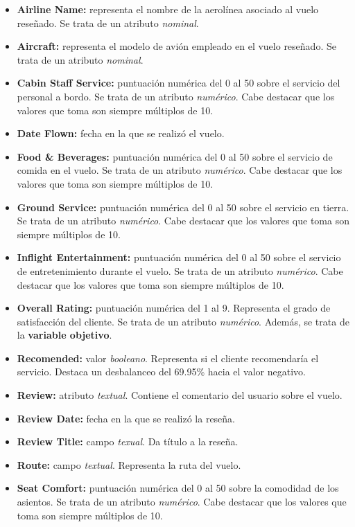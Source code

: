 \documentclass[es]{uc3mreport}
\begin{document}
\begin{report}
\begin{itemize}
    \item \textbf{Airline Name:} representa el nombre de la aerolínea asociado al vuelo reseñado. Se trata de un atributo \textit{nominal}.
    \item \textbf{Aircraft:} representa el modelo de avión empleado en el vuelo reseñado. Se trata de un atributo \textit{nominal}.
    \item \textbf{Cabin Staff Service:} puntuación numérica del 0 al 50 sobre el servicio del personal a bordo. Se trata de un atributo \textit{numérico}. Cabe destacar que los valores que toma son siempre múltiplos de 10.
    \item \textbf{Date Flown:} fecha en la que se realizó el vuelo.
    \item \textbf{Food \& Beverages:} puntuación numérica del 0 al 50 sobre el servicio de comida en el vuelo. Se trata de un atributo \textit{numérico}. Cabe destacar que los valores que toma son siempre múltiplos de 10.
    \item \textbf{Ground Service:} puntuación numérica del 0 al 50 sobre el servicio en tierra. Se trata de un atributo \textit{numérico}. Cabe destacar que los valores que toma son siempre múltiplos de 10.
    \item \textbf{Inflight Entertainment:} puntuación numérica del 0 al 50 sobre el servicio de entretenimiento durante el vuelo. Se trata de un atributo \textit{numérico}. Cabe destacar que los valores que toma son siempre múltiplos de 10.
    \item \textbf{Overall Rating:} puntuación numérica del 1 al 9. Representa el
    grado de satisfacción del cliente. Se trata de un atributo
    \textit{numérico}. Además, se trata de la \textbf{variable objetivo}.
    \item \textbf{Recomended:} valor \textit{booleano}. Representa si el cliente recomendaría el servicio. Destaca un desbalanceo del 69.95\% hacia el valor negativo.
    \item \textbf{Review:} atributo \textit{textual}. Contiene el comentario del usuario sobre el vuelo.
    \item \textbf{Review Date:} fecha en la que se realizó la reseña.
    \item \textbf{Review Title:} campo \textit{texual}. Da título a la reseña.
    \item \textbf{Route:} campo \textit{textual}. Representa la ruta del vuelo.
    \item \textbf{Seat Comfort:} puntuación numérica del 0 al 50 sobre la comodidad de los asientos. Se trata de un atributo \textit{numérico}. Cabe destacar que los valores que toma son siempre múltiplos de 10.

\end{itemize}
\end{report}
\end{document}
